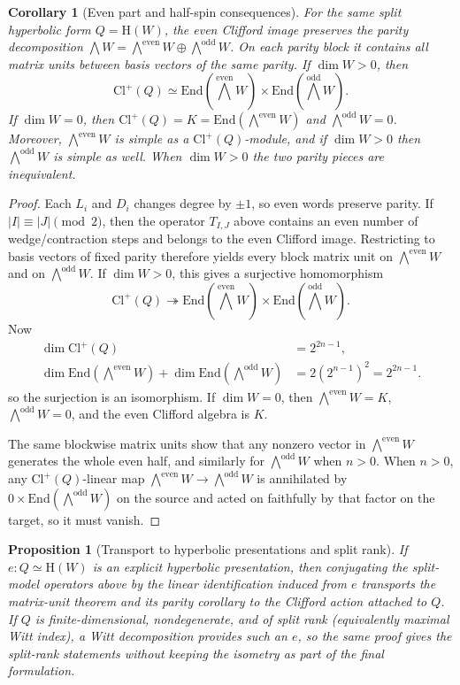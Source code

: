 \documentclass{birkjour}
\theoremstyle{plain}
\newtheorem{proposition}[theorem]{Proposition}
\newtheorem{corollary}[theorem]{Corollary}
\theoremstyle{definition}
\theoremstyle{remark}
\numberwithin{equation}{section}
\newcommand{\Cl}{\mathrm{Cl}}
\newcommand{\End}{\mathrm{End}}
\newcommand{\Hyp}{\mathrm{H}}
\newcommand{\wedgeEven}{\bigwedge^{\mathrm{even}} W}
\newcommand{\wedgeOdd}{\bigwedge^{\mathrm{odd}} W}
\begin{document}
\begin{corollary}[Even part and half-spin consequences]
\label{cor:even-half-spin}
For the same split hyperbolic form $Q=\Hyp(W)$, the even Clifford image
preserves the parity decomposition
$\bigwedge W=\wedgeEven\oplus\wedgeOdd$. On each parity block it contains all
matrix units between basis vectors of the same parity. If $\dim W>0$, then
\[
  \Cl^+(Q)\simeq \End(\wedgeEven)\times \End(\wedgeOdd).
\]
If $\dim W=0$, then $\Cl^+(Q)=K=\End(\wedgeEven)$ and $\wedgeOdd=0$. Moreover,
$\wedgeEven$ is simple as a $\Cl^+(Q)$-module, and if $\dim W>0$ then
$\wedgeOdd$ is simple as well. When $\dim W>0$ the two parity pieces are
inequivalent.
\end{corollary}

\begin{proof}
Each $L_i$ and $D_i$ changes degree by $\pm 1$, so even words preserve parity.
If $|I|\equiv |J|\pmod 2$, then the operator $T_{I,J}$ above contains an even
number of wedge/contraction steps and belongs to the even Clifford image.
Restricting to basis vectors of fixed parity therefore yields every block matrix
unit on $\wedgeEven$ and on $\wedgeOdd$. If $\dim W>0$, this gives a surjective
homomorphism
\[
  \Cl^+(Q)\twoheadrightarrow \End(\wedgeEven)\times \End(\wedgeOdd).
\]
Now
\[
  \begin{aligned}
  \dim \Cl^+(Q) &= 2^{2n-1}, \\
  \dim \End(\wedgeEven)+\dim \End(\wedgeOdd)
    &= 2(2^{n-1})^2 = 2^{2n-1}.
  \end{aligned}
\]
so the surjection is an isomorphism. If $\dim W=0$, then $\wedgeEven=K$,
$\wedgeOdd=0$, and the even Clifford algebra is \(K\).

The same blockwise matrix units show that any nonzero vector in $\wedgeEven$
generates the whole even half, and similarly for $\wedgeOdd$ when $n>0$.
When $n>0$, any $\Cl^+(Q)$-linear map $\wedgeEven\to\wedgeOdd$ is annihilated by
$0\times \End(\wedgeOdd)$ on the source and acted on faithfully by that factor
on the target, so it must vanish.
\end{proof}

\begin{proposition}[Transport to hyperbolic presentations and split rank]
\label{prop:transport-split}
If $e:Q \simeq \Hyp(W)$ is an explicit hyperbolic presentation, then
conjugating the split-model operators above by the linear identification
induced from $e$ transports the matrix-unit theorem and its parity corollary to
the Clifford action attached to $Q$. If $Q$ is finite-dimensional,
nondegenerate, and of split rank (equivalently maximal Witt index), a Witt decomposition provides
such an $e$, so the same proof gives the split-rank statements without keeping
the isometry as part of the final formulation.
\end{proposition}
\end{document}
